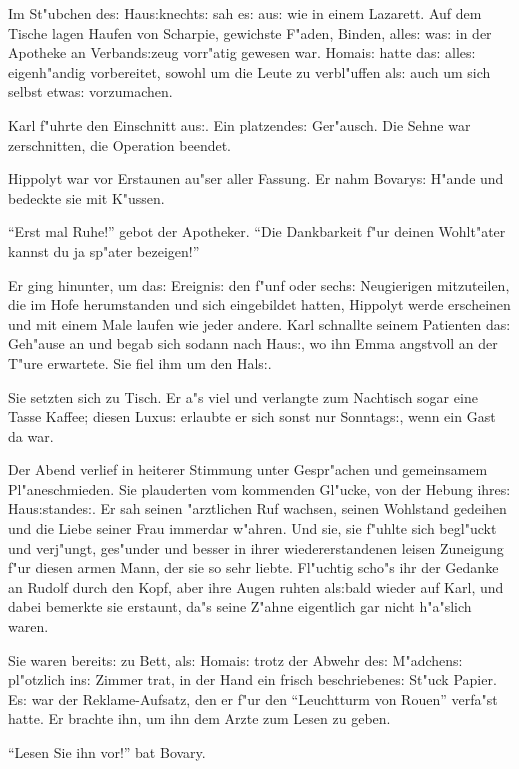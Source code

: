 \documentclass[oneside,12pt]{book}
\newcommand{\s}{s:}%
\begin{document}
Im St"ubchen de{\s} Hau{\s}knecht{\s} sah e{\s} au{\s} wie in
einem Lazarett. Auf dem Tische lagen Haufen von Scharpie,
gewichste F"aden, Binden, alle{\s} wa{\s} in der Apotheke an
Verband{\s}zeug vorr"atig gewesen war. Homai{\s} hatte da{\s}
alle{\s} eigenh"andig vorbereitet, sowohl um die Leute zu
verbl"uffen al{\s} auch um sich selbst etwa{\s} vorzumachen.

Karl f"uhrte den Einschnitt au{\s}. Ein platzende{\s} Ger"ausch.
Die Sehne war zerschnitten, die Operation beendet.

Hippolyt war vor Erstaunen au"ser aller Fassung. Er nahm
Bovary{\s} H"ande und bedeckte sie mit K"ussen.

"`Erst mal Ruhe!"' gebot der Apotheker. "`Die Dankbarkeit f"ur
deinen Wohlt"ater kannst du ja sp"ater bezeigen!"'

Er ging hinunter, um da{\s} Ereigni{\s} den f"unf oder sech{\s}
Neugierigen mit\/zuteilen, die im Hofe herumstanden und sich
eingebildet hatten, Hippolyt werde erscheinen und mit einem Male
laufen wie jeder andere. Karl schnallte seinem Patienten da{\s}
Geh"ause an und begab sich sodann nach Hau{\s}, wo ihn Emma
angstvoll an der T"ure erwartete. Sie fiel ihm um den Hal{\s}.

Sie setzten sich zu Tisch. Er a"s viel und verlangte zum Nachtisch
sogar eine Tasse Kaffee; diesen Luxu{\s} erlaubte er sich sonst
nur Sonntag{\s}, wenn ein Gast da war.

Der Abend verlief in heiterer Stimmung unter Gespr"achen und
gemeinsamem Pl"aneschmieden. Sie plauderten vom kommenden Gl"ucke,
von der Hebung ihre{\s} Hau{\s}stande{\s}. Er sah seinen
"arztlichen Ruf wachsen, seinen Wohlstand gedeihen und die Liebe
seiner Frau immerdar w"ahren. Und sie, sie f"uhlte sich begl"uckt
und verj"ungt, ges"under und besser in ihrer wiedererstandenen
leisen Zuneigung f"ur diesen armen Mann, der sie so sehr liebte.
Fl"uchtig scho"s ihr der Gedanke an Rudolf durch den Kopf, aber
ihre Augen ruhten al{\s}bald wieder auf Karl, und dabei bemerkte
sie erstaunt, da"s seine Z"ahne eigentlich gar nicht h"a"slich
waren.

Sie waren bereit{\s} zu Bett, al{\s} Homai{\s} trotz der Abwehr
de{\s} M"adchen{\s} pl"otzlich in{\s} Zimmer trat, in der Hand ein
frisch beschriebene{\s} St"uck Papier. E{\s} war der
Reklame-Aufsatz, den er f"ur den "`Leuchtturm von Rouen"' verfa"st
hatte. Er brachte ihn, um ihn dem Arzte zum Lesen zu geben.

"`Lesen Sie ihn vor!"' bat Bovary.
\end{document}
